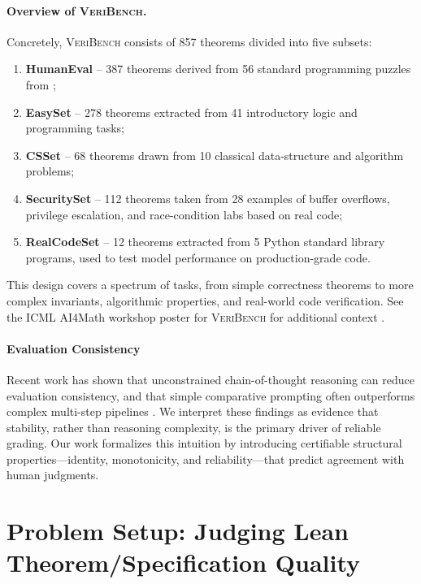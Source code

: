 \documentclass{article}
\begin{document}
\paragraph{Overview of \textsc{VeriBench}.}
Concretely, \textsc{VeriBench} consists of 857 theorems divided into five subsets:
\begin{enumerate}
  \item \textbf{HumanEval} – 387 theorems derived from 56 standard programming puzzles from \citet{chen2021evaluating};
  \item \textbf{EasySet} – 278 theorems extracted from 41 introductory logic and programming tasks;
  \item \textbf{CSSet} – 68 theorems drawn from 10 classical data-structure and algorithm problems;
  \item \textbf{SecuritySet} – 112 theorems taken from 28 examples of buffer overflows, privilege escalation, and race-condition labs based on real code;
  \item \textbf{RealCodeSet} – 12 theorems extracted from 5 Python standard library programs, used to test model performance on production-grade code.
\end{enumerate}
This design covers a spectrum of tasks, from simple correctness theorems to more complex invariants, algorithmic properties, and real-world code verification. See the ICML AI4Math workshop poster for \textsc{VeriBench} for additional context \citep{veribench_icml25}.

\paragraph{Evaluation Consistency}

Recent work has shown that unconstrained chain-of-thought reasoning can reduce evaluation consistency, and that simple comparative prompting often outperforms complex multi-step pipelines \cite{chen2026rethinking}. We interpret these findings as evidence that stability, rather than reasoning complexity, is the primary driver of reliable grading. Our work formalizes this intuition by introducing certifiable structural properties---identity, monotonicity, and reliability---that predict agreement with human judgments.

\section{Problem Setup: Judging Lean Theorem/Specification Quality}
\end{document}
